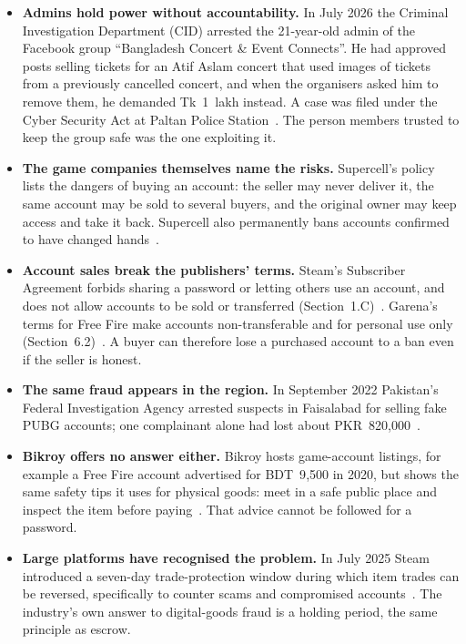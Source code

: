 \begin{itemize}
  \item \textbf{Admins hold power without accountability.} In July 2026 the Criminal
  Investigation Department (CID) arrested the 21-year-old admin of the Facebook group
  ``Bangladesh Concert \& Event Connects''. He had approved posts selling tickets for an
  Atif Aslam concert that used images of tickets from a previously cancelled concert, and when
  the organisers asked him to remove them, he demanded Tk~1~lakh instead. A case was filed under
  the Cyber Security Act at Paltan Police Station~\cite{fe_bcec}. The person members trusted to
  keep the group safe was the one exploiting it.

  \item \textbf{The game companies themselves name the risks.} Supercell's policy lists the
  dangers of buying an account: the seller may never deliver it, the same account may be sold
  to several buyers, and the original owner may keep access and take it back. Supercell also
  permanently bans accounts confirmed to have changed hands~\cite{supercell_fairplay}.

  \item \textbf{Account sales break the publishers' terms.} Steam's Subscriber Agreement forbids
  sharing a password or letting others use an account, and does not allow accounts to be sold or
  transferred (Section~1.C)~\cite{steam_ssa}. Garena's terms for Free Fire make accounts
  non-transferable and for personal use only (Section~6.2)~\cite{sk_garena}. A buyer can
  therefore lose a purchased account to a ban even if the seller is honest.

  \item \textbf{The same fraud appears in the region.} In September 2022 Pakistan's Federal
  Investigation Agency arrested suspects in Faisalabad for selling fake PUBG accounts; one
  complainant alone had lost about PKR~820{,}000~\cite{techjuice_pubg}.

  \item \textbf{Bikroy offers no answer either.} Bikroy hosts game-account listings, for example
  a Free Fire account advertised for BDT~9{,}500 in 2020, but shows the same safety tips it uses for
  physical goods: meet in a safe public place and inspect the item before
  paying~\cite{bikroy_ff}. That advice cannot be followed for a password.

  \item \textbf{Large platforms have recognised the problem.} In July 2025 Steam introduced a
  seven-day trade-protection window during which item trades can be reversed, specifically to
  counter scams and compromised accounts~\cite{pcworld_steam}. The industry's own answer to
  digital-goods fraud is a holding period, the same principle as escrow.
\end{itemize}

